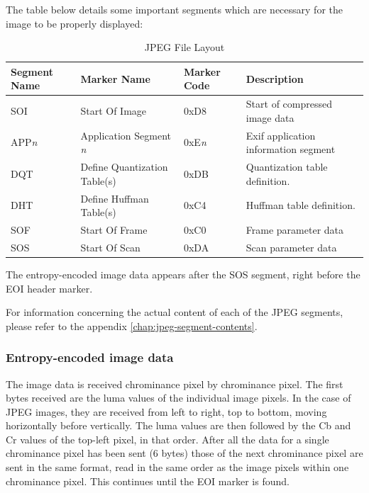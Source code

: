 The table below details some important segments which are necessary for the image
to be properly displayed: \cite{exif_std}

\begin{table}[!hbtp]
	\caption{JPEG File Layout}
	\centering
	\begin{tabular}{ | p{1.5cm} | p{3cm} | p{2cm} | p{2.8cm} | }
	\hline
	\textbf{Segment Name} & \textbf{Marker Name} & 
	\textbf{Marker Code} & \textbf{Description} \\ \hline
	SOI & Start Of Image & 0xD8 & Start of compressed image data\\ \hline
	APP\emph{n} & Application Segment \emph{n} & 0xE\emph{n} & Exif application information segment\\ \hline
	DQT & Define Quantization Table(s) & 0xDB & Quantization table definition.\\ \hline
	DHT & Define Huffman Table(s) & 0xC4 & Huffman table definition.\\ \hline
	SOF & Start Of Frame & 0xC0 & Frame parameter data\\ \hline
	SOS & Start Of Scan & 0xDA & Scan parameter data\\ \hline
	\end{tabular}
\end{table}

The entropy-encoded image data appears after the SOS segment,
right before the EOI header marker.

For information concerning the actual content of each of the 
JPEG segments, please refer to the appendix \ref{chap:jpeg-segment-contents}.

\subsubsection{Entropy-encoded image data}
\label{sec:entropycrho}

The image data is received chrominance pixel by chrominance pixel. 
The first bytes received are the luma values of the individual image pixels. 
In the case of JPEG images, they are received from left to right, top to bottom, moving horizontally before vertically. 
The luma values are then followed by the Cb and Cr values of the top-left pixel, in that order. 
After all the data for a single chrominance pixel has been sent (6 bytes) those of the next chrominance pixel are sent in the same format, 
read in the same order as the image pixels within one chrominance pixel. This continues until the EOI marker is found.
